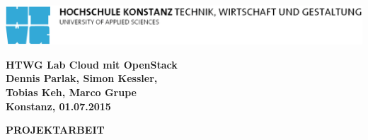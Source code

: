 \begin{titlepage}

\vspace*{-3.5cm}

\begin{flushleft}
\hspace*{-1cm} \includegraphics[width=15.7cm]{htwg-logo}
\end{flushleft}

\vspace{2.5cm}

\begin{center}
	\huge{
		\textbf{HTWG Lab Cloud mit OpenStack} \\[5cm]
	}
	\Large{
		\textbf{Dennis Parlak, Simon Kessler,\\Tobias Keh, Marco Grupe}} \\[6.5cm]
	\large{
		\textbf{Konstanz, 01.07.2015} \\[2.3cm]
	}
	
	\Huge{
		\textbf{{\sf PROJEKTARBEIT}}
	}
\end{center}

\end{titlepage}